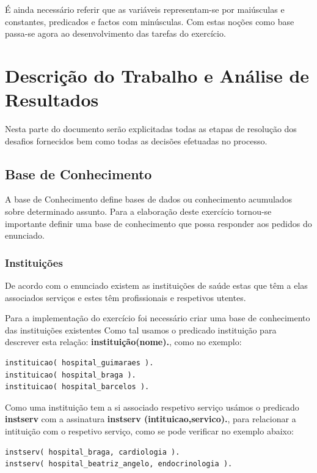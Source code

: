 É ainda necessário referir que as variáveis representam-se por maiúsculas e constantes, predicados e factos com minúsculas.
Com estas noções como base passa-se agora ao desenvolvimento das tarefas do exercício.



\chapter{Descrição do Trabalho e Análise de Resultados}
\label{cap:p3}

Nesta parte do documento serão explicitadas todas as etapas de resolução dos desafios fornecidos bem como todas as decisões efetuadas no processo.


\section{Base de Conhecimento}
\label{p3:baseConhe}

A base de Conhecimento define bases de dados ou conhecimento acumulados sobre determinado assunto.
Para a elaboração deste exercício tornou-se importante definir uma base de conhecimento
que possa responder aos pedidos do enunciado.

\subsection{Instituições}

De acordo com o enunciado existem as instituições de saúde estas que têm a elas associados serviços e estes têm profissionais e respetivos utentes. 

Para a implementação do exercício foi necessário criar uma base de conhecimento das instituições existentes 
Como tal usamos o predicado instituição para descrever esta relação: \textbf{instituição(nome).}, como no exemplo: 

\begin{verbatim}
instituicao( hospital_guimaraes ). 
instituicao( hospital_braga ).
instituicao( hospital_barcelos ).
\end{verbatim}

Como uma instituição tem a si associado respetivo serviço usámos o predicado \textbf{instserv} com a  assinatura \textbf{instserv (intituicao,servico).}, para relacionar a intituição com o respetivo serviço, como se pode verificar no exemplo abaixo: 

\begin{verbatim}
instserv( hospital_braga, cardiologia ).
instserv( hospital_beatriz_angelo, endocrinologia ).
\end{verbatim}

